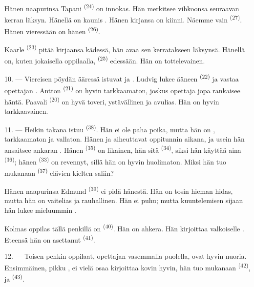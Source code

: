 Hänen naapurinsa Tapani \textsuperscript{(24)} on innokas. Hän merkitsee
vihkoonsa seuraavan kerran läksyn. Hänellä on kaunis . Hänen
kirjansa on kiinni. Näemme vain  \textsuperscript{(27)}. Hänen
vieressään on hänen  \textsuperscript{(26)}.

Kaarle \textsuperscript{(23)} pitää kirjaansa kädessä, hän avaa sen
kerratakseen läksynsä. Hänellä on, kuten jokaisella oppilaalla,
 \textsuperscript{(25)} edessään. Hän on tottelevainen.

10. --- Viereisen pöydän ääressä istuvat  ja
. Ludvig lukee ääneen  \textsuperscript{(22)}
ja vastaa opettajan . Antton \textsuperscript{(21)} on
hyvin tarkkaamaton, joskus opettaja jopa rankaisee häntä. Paavali
\textsuperscript{(20)} on hyvä toveri, ystävällinen ja avulias. Hän on hyvin
tarkkaavainen.

\VUsaut{4.2mm}
\VUsaut{3.2mm}

11. --- Heikin takana istuu  \textsuperscript{(38)}. Hän ei ole
paha poika, mutta hän on , tarkkaamaton ja vallaton. Hänen
 ja  aiheuttavat
 oppitunnin aikana, ja usein hän ansaitsee ankaran
. Hänen  \textsuperscript{(35)} on
likainen, hän  sitä  
\textsuperscript{(34)}, siksi hän käyttää aina 
\textsuperscript{(36)}; hänen  \textsuperscript{(33)} on
revennyt, sillä hän on hyvin huolimaton. Miksi hän tuo mukanaan
 \textsuperscript{(37)} elävien kielten saliin?

Hänen naapurinsa Edmund \textsuperscript{(39)} ei pidä hänestä. Hän on tosin
hieman hidas, mutta hän on vaitelias ja rauhallinen. Hän ei puhu; mutta
kuuntelemisen sijaan hän lukee mieluummin 
.

Kolmas oppilas tällä penkillä on  \textsuperscript{(40)}. Hän on
ahkera. Hän kirjoittaa valkoiselle . Eteensä hän on
asettanut  \textsuperscript{(41)}.

12. --- Toisen penkin oppilaat, opettajan vasemmalla puolella, ovat hyvin
nuoria. Ensimmäinen, pikku , ei vielä osaa kirjoittaa kovin hyvin,
hän tuo mukanaan  \textsuperscript{(42)},
 ja  \textsuperscript{(43)}.

